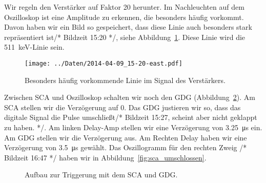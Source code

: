 Wir regeln den Verstärker auf Faktor 20 herunter. Im Nachleuchten auf dem
Oszilloskop ist eine Amplitude zu erkennen, die besonders häufig vorkommt. Davon
haben wir ein Bild so gespeichert, dass diese Linie auch besonders stark
repräsentiert ist/* Bildzeit 15:20 */, siehe Abbildung~\ref{fig:511}. Diese
Linie wird die \SI{511}{\kilo\electronvolt}-Linie sein.

\begin{figure}[htbp]
    \centering
    \texttt{[image: ../Daten/2014-04-09\_15-20-east.pdf]}
    \caption{%
        Besonders häufig vorkommende Linie im Signal des Verstärkers.
    }
    \label{fig:511}
\end{figure}

Zwischen SCA und Oszilloskop schalten wir noch den GDG
(Abbildung~\ref{fig:aufbau:sca_gdg}). Am SCA stellen wir die Verzögerung auf 0.
Das GDG justieren wir so, dass das digitale Signal die Pulse umschließt/*
Bildzeit 15:27, scheint aber nicht geklappt zu haben. */. Am linken Delay-Amp
stellen wir eine Verzögerung von \SI{3.25}{\micro\second} ein. Am GDG stellen
wir die Verzögerung aus. Am Rechten Delay haben wir eine Verzögerung von
\SI{3.5}{\micro\second} gewählt. Das Oszillogramm für den rechten Zweig
/* Bildzeit 16:47 */ haben wir in Abbildung~\ref{fig:sca_umschlossen}.

\begin{figure}[htbp]
    \centering
    \caption{%
        Aufbau zur Triggerung mit dem SCA und GDG.
    }
    \label{fig:aufbau:sca_gdg}
\end{figure}

